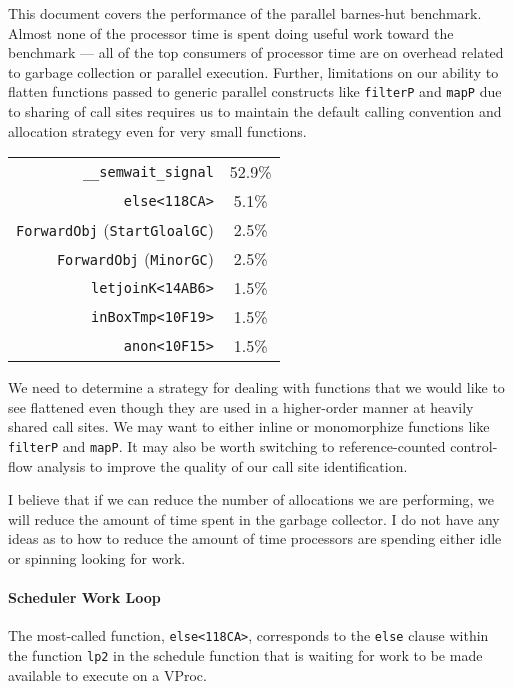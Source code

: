 \documentclass[11pt]{article}
\begin{document}
This document covers the performance of the parallel barnes-hut benchmark.
Almost none of the processor time is spent doing useful work toward the benchmark --- all of the top consumers of processor time are on overhead related to garbage collection or parallel execution.
Further, limitations on our ability to flatten functions passed to generic parallel constructs like \texttt{filterP} and \texttt{mapP} due to sharing of call sites requires us to maintain the default calling convention and allocation strategy even for very small functions.

\begin{center}
\begin{tabular}{r|c}
\texttt{\_\_semwait\_signal} & 52.9\% \\
\texttt{else<118CA>} & 5.1\% \\
\texttt{ForwardObj} (\texttt{StartGloalGC}) & 2.5\%\\
\texttt{ForwardObj} (\texttt{MinorGC}) & 2.5\% \\
\texttt{letjoinK<14AB6>} & 1.5\% \\
\texttt{inBoxTmp<10F19>} & 1.5\%\\
\texttt{anon<10F15>} & 1.5\%\\ %
\end{tabular}
\end{center}

We need to determine a strategy for dealing with functions that we would like to see flattened even though they are used in a higher-order manner at heavily shared call sites.
We may want to either inline or monomorphize functions like \texttt{filterP} and \texttt{mapP}.
It may also be worth switching to reference-counted control-flow analysis to improve the quality of our call site identification.

I believe that if we can reduce the number of allocations we are performing, we will reduce the amount of time spent in the garbage collector.
I do not have any ideas as to how to reduce the amount of time processors are spending either idle or spinning looking for work.

\paragraph{Scheduler Work Loop}

The most-called function, \texttt{else<118CA>}, corresponds to the \texttt{else} clause within the function \texttt{lp2} in the schedule function that is waiting for work to be made available to execute on a VProc.
\end{document}
